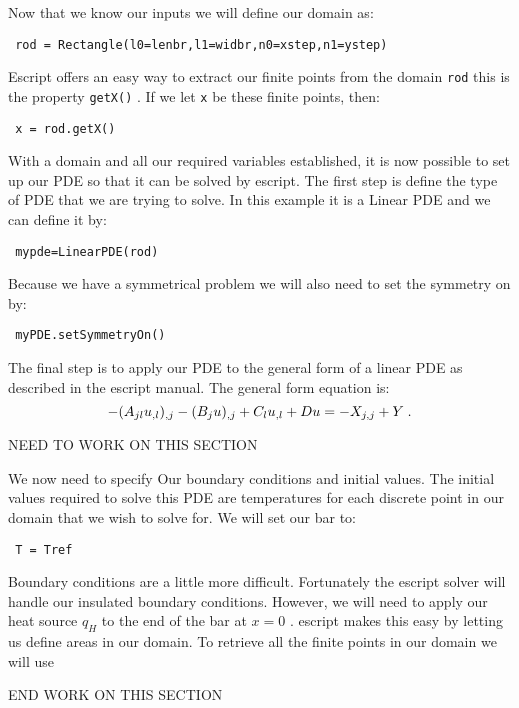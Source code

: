 \documentclass{manual}
\begin{document}
Now that we know our inputs we will define our domain as:
\begin{verbatim}
 rod = Rectangle(l0=lenbr,l1=widbr,n0=xstep,n1=ystep)
\end{verbatim}
Escript offers an easy way to extract our finite points from the domain \verb|rod| this is the property \verb|getX()| . If we let \verb|x| be these finite points, then:
\begin{verbatim}
 x = rod.getX()
\end{verbatim}
With a domain and all our required variables established, it is now possible to set up our PDE so that it can be solved by escript. The first step is define the type of PDE that we are trying to solve. In this example it is a Linear PDE and we can define it by:
\begin{verbatim}
 mypde=LinearPDE(rod)
\end{verbatim}
Because we have a symmetrical problem we will also need to set the symmetry on by:
\begin{verbatim}
 myPDE.setSymmetryOn()
\end{verbatim}
The final step is to apply our PDE to the general form of a linear PDE as described in the escript manual. The general form equation is:
\begin{equation}\label{LINEARPDE.SINGLE.1}
-(A\hackscore{jl} u\hackscore{,l})\hackscore{,j}-(B\hackscore{j} u)\hackscore{,j}+C\hackscore{l} u\hackscore{,l}+D u =-X\hackscore{j,j}+Y \; .
\end{equation}

NEED TO WORK ON THIS SECTION

We now need to specify Our boundary conditions and initial values. The initial values required to solve this PDE are temperatures for each discrete point in our domain that we wish to solve for. We will set our bar to:
\begin{verbatim}
 T = Tref
\end{verbatim}
Boundary conditions are a little more difficult. Fortunately the escript solver will handle our insulated boundary conditions. However, we will need to apply our heat source $q_{H}$ to the end of the bar at $x=0$ . escript makes this easy by letting us define areas in our domain. To retrieve all the finite points in our domain we will use 

END WORK ON THIS SECTION
\end{document}
